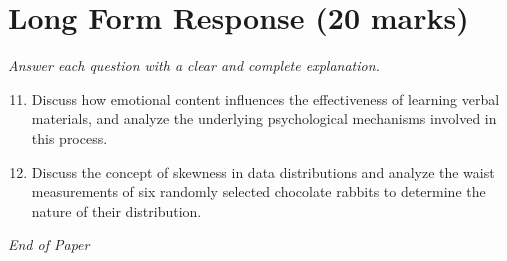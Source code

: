 \documentclass[12pt]{article}
\begin{document}
\section*{Long Form Response (20 marks)}
\textit{Answer each question with a clear and complete explanation.}
\begin{enumerate}[label=\arabic*.]
\setcounter{enumi}{10}
\item Discuss how emotional content influences the effectiveness of learning verbal materials, and analyze the underlying psychological mechanisms involved in this process.
\item Discuss the concept of skewness in data distributions and analyze the waist measurements of six randomly selected chocolate rabbits to determine the nature of their distribution.
\end{enumerate}

\vfill
\noindent\textit{End of Paper}
\end{document}
